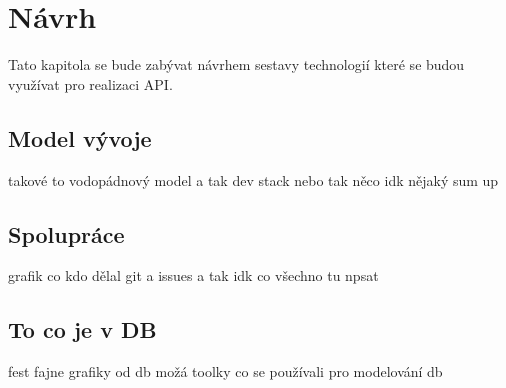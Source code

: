 \chapter{Návrh}
Tato kapitola se bude zabývat návrhem sestavy technologií které se budou využívat pro realizaci API.

\section{Model vývoje}
takové to vodopádnový model a tak
dev stack nebo tak něco idk nějaký sum up
\section{Spolupráce}
grafik co kdo dělal
git a issues a tak idk co všechno tu npsat
\section{To co je v DB}
fest fajne grafiky od db možá toolky co se používali pro modelování db



